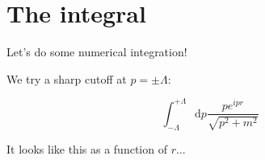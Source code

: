 \documentclass[aspectratio=169]{beamer}
\newcommand{\integrand}{\frac{p e^{ipr}}{\sqrt{p^2 + m^2}}}
\newcommand{\diffop}{\mathop{}\!\mathrm{d}}
\newcommand{\dip}{\diffop p}
\begin{document}





\section{The integral}

\begin{frame}
Let's do some numerical integration!
\end{frame}


\begin{frame}
We try a sharp \alert{cutoff} at $p = \pm \Lambda$:

\pause
$$\int_{-\Lambda}^{+\Lambda} \dip \integrand$$

\pause
\bigskip
It looks like this \alert{as a function of $r$}...
\end{frame}
\end{document}

